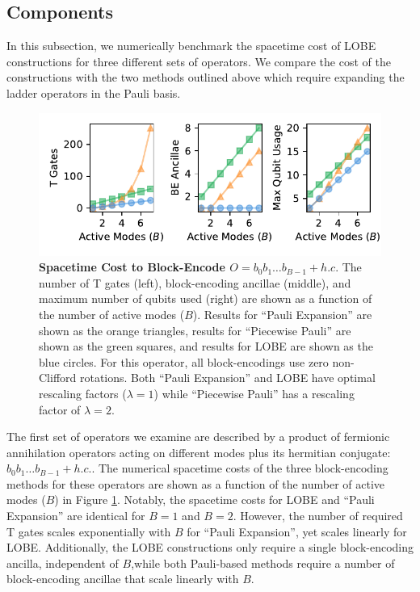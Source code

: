 
\subsection{Components}

In this subsection, we numerically benchmark the spacetime cost of LOBE constructions for three different sets of operators.
We compare the cost of the constructions with the two methods outlined above which require expanding the ladder operators in the Pauli basis.

\begin{figure}
    \centering
    \includegraphics[width=12cm]{figures/fermionic-hc-comparison.pdf}
    \caption{
        \textbf{Spacetime Cost to Block-Encode $O = b_0 b_1 \hdots b_{B-1} + h.c.$}
        The number of T gates (left), block-encoding ancillae (middle), and maximum number of qubits used (right) are shown as a function of the number of active modes ($B$).
        Results for ``Pauli Expansion'' are shown as the orange triangles, results for ``Piecewise Pauli'' are shown as the green squares, and results for LOBE are shown as the blue circles.
        For this operator, all block-encodings use zero non-Clifford rotations.
        Both ``Pauli Expansion'' and LOBE have optimal rescaling factors ($\lambda = 1$) while ``Piecewise Pauli'' has a rescaling factor of $\lambda = 2$.
    }
    \label{fig:fermionic-hc-comparison}
\end{figure}

The first set of operators we examine are described by a product of fermionic annihilation operators acting on different modes plus its hermitian conjugate: $b_0 b_1 \hdots b_{B-1} + h.c.$.
The numerical spacetime costs of the three block-encoding methods for these operators are shown as a function of the number of active modes ($B$) in Figure \ref{fig:fermionic-hc-comparison}.
Notably, the spacetime costs for LOBE and ``Pauli Expansion'' are identical for $B = 1$ and $B = 2$.
However, the number of required T gates scales exponentially with $B$ for ``Pauli Expansion'', yet scales linearly for LOBE.
Additionally, the LOBE constructions only require a single block-encoding ancilla, independent of $B$,while both Pauli-based methods require a number of block-encoding ancillae that scale linearly with $B$.

